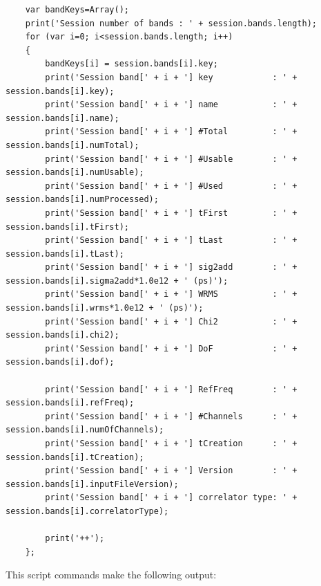 \documentclass [10pt,letterpaper]{report}
\begin{document}
{\small\begin{verbatim}
    var bandKeys=Array();
    print('Session number of bands : ' + session.bands.length);
    for (var i=0; i<session.bands.length; i++)
    {
        bandKeys[i] = session.bands[i].key;
        print('Session band[' + i + '] key            : ' + session.bands[i].key);
        print('Session band[' + i + '] name           : ' + session.bands[i].name);
        print('Session band[' + i + '] #Total         : ' + session.bands[i].numTotal);
        print('Session band[' + i + '] #Usable        : ' + session.bands[i].numUsable);
        print('Session band[' + i + '] #Used          : ' + session.bands[i].numProcessed);
        print('Session band[' + i + '] tFirst         : ' + session.bands[i].tFirst);
        print('Session band[' + i + '] tLast          : ' + session.bands[i].tLast);
        print('Session band[' + i + '] sig2add        : ' + session.bands[i].sigma2add*1.0e12 + ' (ps)');
        print('Session band[' + i + '] WRMS           : ' + session.bands[i].wrms*1.0e12 + ' (ps)');
        print('Session band[' + i + '] Chi2           : ' + session.bands[i].chi2);
        print('Session band[' + i + '] DoF            : ' + session.bands[i].dof);

        print('Session band[' + i + '] RefFreq        : ' + session.bands[i].refFreq);
        print('Session band[' + i + '] #Channels      : ' + session.bands[i].numOfChannels);
        print('Session band[' + i + '] tCreation      : ' + session.bands[i].tCreation);
        print('Session band[' + i + '] Version        : ' + session.bands[i].inputFileVersion);
        print('Session band[' + i + '] correlator type: ' + session.bands[i].correlatorType);

        print('++');
    };
\end{verbatim}}
\noindent
This script commands make the following output:
\end{document}
